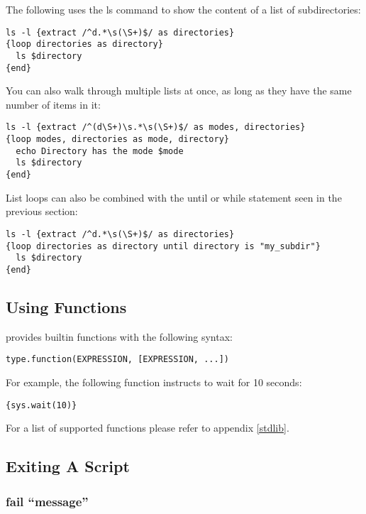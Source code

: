 The following \product uses the ls command to show the content of a list 
of subdirectories: 

\begin{lstlisting}
ls -l {extract /^d.*\s(\S+)$/ as directories}
{loop directories as directory}
  ls $directory
{end}
\end{lstlisting}

You can also walk through multiple lists at once, as long as they have the 
same number of items in it: 

\begin{lstlisting}
ls -l {extract /^(d\S+)\s.*\s(\S+)$/ as modes, directories}
{loop modes, directories as mode, directory}
  echo Directory has the mode $mode
  ls $directory
{end}
\end{lstlisting}

List loops can also be combined with the until or while statement seen in 
the previous section: 

\begin{lstlisting}
ls -l {extract /^d.*\s(\S+)$/ as directories}
{loop directories as directory until directory is "my_subdir"}
  ls $directory
{end}
\end{lstlisting}


\subsection{Using Functions}

\product provides builtin functions with the following syntax: 

\begin{lstlisting}
type.function(EXPRESSION, [EXPRESSION, ...])
\end{lstlisting}

For example, the following function instructs \product to wait for 10 seconds: 

\begin{lstlisting}
{sys.wait(10)}
\end{lstlisting}

For a list of supported functions please refer to appendix \ref{stdlib}.


\subsection{Exiting A Script}

\subsubsection{fail ``message''}

